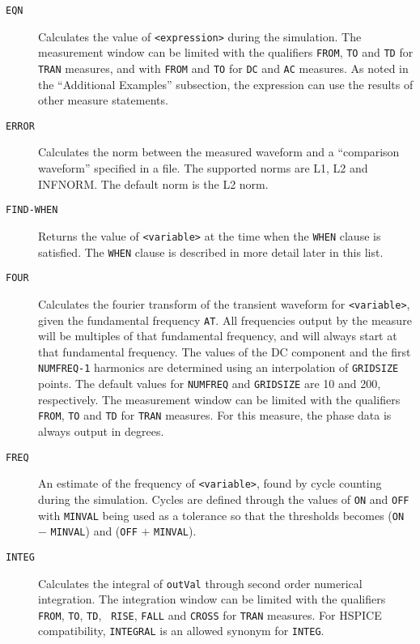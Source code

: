\begin{Command}
\begin{Arguments}
\begin{description}
\item[\tt EQN] Calculates the value of {\tt <expression>} during the simulation.
    The measurement window can be limited with the qualifiers {\tt FROM},
    {\tt TO} and {\tt TD} for {\tt TRAN} measures, and with {\tt FROM}
    and {\tt TO} for {\tt DC} and {\tt AC} measures.  As noted in the
    ``Additional Examples'' subsection, the expression can use the
    results of other measure statements.

  \item[\tt ERROR] Calculates the norm between the measured waveform and a
   ``comparison waveform'' specified in a file.  The supported norms are
    L1, L2 and INFNORM.  The default norm is the L2 norm.

  \item[\tt FIND-WHEN] Returns the value of {\tt <variable>} at the
    time when the {\tt WHEN} clause is satisfied.  The {\tt WHEN}
    clause is described in more detail later in this list.

  \item[\tt FOUR] Calculates the fourier transform of the transient
    waveform for {\tt <variable>}, given the fundamental frequency
    {\tt AT}.  All frequencies output by the measure will be multiples
    of that fundamental frequency, and will always start at that
    fundamental frequency. The values of the DC component and the
    first {\tt NUMFREQ-1} harmonics are determined using an
    interpolation of {\tt GRIDSIZE} points.  The default values for
    {\tt NUMFREQ} and {\tt GRIDSIZE} are 10 and 200, respectively.
    The measurement window can be limited with the qualifiers {\tt
    FROM}, {\tt TO} and {\tt TD} for {\tt TRAN} measures.  For this
    measure, the phase data is always output in degrees.

  \item[\tt FREQ] An estimate of the frequency of {\tt <variable>},
    found by cycle counting during the simulation.  Cycles are defined
    through the values of {\tt ON} and {\tt OFF} with {\tt MINVAL}
    being used as a tolerance so that the thresholds becomes ({\tt ON}
    $-$ {\tt MINVAL}) and ({\tt OFF} $+$ {\tt MINVAL}).

  \item[\tt INTEG] Calculates the integral of {\tt outVal} through
    second order numerical integration.  The integration window can be
    limited with the qualifiers {\tt FROM}, {\tt TO}, {\tt TD}, {\tt
    RISE}, {\tt FALL} and {\tt CROSS} for {\tt TRAN} measures.  For
    HSPICE compatibility, {\tt INTEGRAL} is an allowed synonym for
    {\tt INTEG}.


\end{description}
\end{Arguments}
\end{Command}
